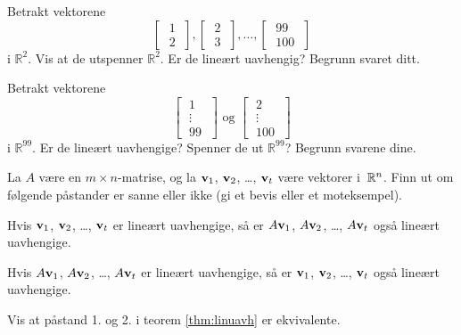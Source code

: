 \begin{oppgave}
\begin{punkt}
Betrakt vektorene
\[ 
\begin{bmatrix} \;1\; \\ \;2\; \end{bmatrix}, 
\begin{bmatrix} \;2\; \\ \;3\; \end{bmatrix}, \dots, 
\begin{bmatrix} \;99\; \\ \;100\; \end{bmatrix}
\]
i $\mathbb{R}^2$. Vis at de utspenner $\mathbb{R}^2$. Er de lineært uavhengig? Begrunn svaret ditt.
\end{punkt}

\begin{punkt}
Betrakt vektorene
\[ 
\begin{bmatrix} 
\;1\; \\ 
\;\vdots\; \\ 
\;99\; 
\end{bmatrix}
\text{ og }
\begin{bmatrix} 
\;2\; \\ 
\;\vdots\; \\ 
\;100\; 
\end{bmatrix}
\]
i $\mathbb{R}^{99}$. Er de lineært uavhengige? Spenner de ut $\mathbb{R}^{99}$? Begrunn svarene dine.

\end{punkt}
\end{oppgave}




\begin{oppgave}
La $A$ være en $m \times n$-matrise, og la $\mathbf{v}_1$, $\mathbf{v}_2$,
\ldots, $\mathbf{v}_t$ være vektorer i~$\mathbb{R}^n$.  Finn ut om følgende
påstander er sanne eller ikke (gi et bevis eller et moteksempel).
\begin{punkt}
Hvis $\mathbf{v}_1$, $\mathbf{v}_2$, \ldots, $\mathbf{v}_t$ er lineært uavhengige, så
er $A \mathbf{v}_1$, $A \mathbf{v}_2$, \ldots, $A \mathbf{v}_t$ også lineært
uavhengige.
\end{punkt}
\begin{punkt}
Hvis $A \mathbf{v}_1$, $A \mathbf{v}_2$, \ldots, $A \mathbf{v}_t$ er lineært
uavhengige, så er $\mathbf{v}_1$, $\mathbf{v}_2$, \ldots, $\mathbf{v}_t$ også lineært
uavhengige.
\end{punkt}
\end{oppgave}



\begin{oppgave}
Vis at påstand 1. og 2. i teorem \ref{thm:linuavh} er ekvivalente.
\end{oppgave}
